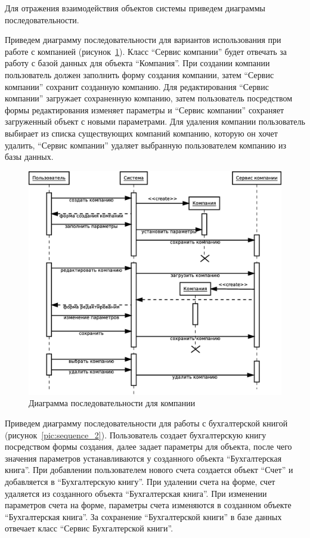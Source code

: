 \documentclass[14pt,a4paper]{reportmod}
\begin{document}
Для отражения взаимодействия объектов системы приведем диаграммы последовательности.

Приведем диаграмму последовательности для вариантов использования при работе с компанией (рисунок~\ref{pic:sequence_1}).  Класс ``Сервис компании'' будет отвечать за работу с базой данных для объекта ``Компания''. При создании компании пользователь должен заполнить форму создания компании, затем ``Сервис компании'' сохранит созданную компанию. Для редактирования ``Сервис компании'' загружает сохраненную компанию, затем пользователь посредством формы редактирования изменяет параметры и ``Сервис компании'' сохраняет загруженный объект с новыми параметрами. Для удаления компании пользователь выбирает из списка существующих компаний компанию, которую он хочет удалить, ``Сервис компании'' удаляет выбранную пользователем компанию из базы данных.

\begin{figure}
  \centering
  \includegraphics[scale=0.4]{uml/_sequence_4}
  \caption{Диаграмма последовательности для компании}
  \label{pic:sequence_1}
\end{figure}

Приведем диаграмму последовательности для работы с бухгалтерской книгой (рисунок~\ref{pic:sequence_2}). Пользователь создает бухгалтерскую книгу посредством формы создания, далее задает параметры для объекта, после чего значения параметров устанавливаются у созданного объекта ``Бухгалтерская книга''. При добавлении пользователем нового счета создается объект ``Счет'' и добавляется в ``Бухгалтерскую книгу''. При удалении счета на форме, счет удаляется из созданного объекта ``Бухгалтерская книга''. При изменении параметров счета на форме, параметры счета изменяются в созданном объекте ``Бухгалтерская книга''. За сохранение ``Бухгалтерской книги'' в базе данных отвечает класс ``Сервис Бухгалтерской книги''.
\end{document}
